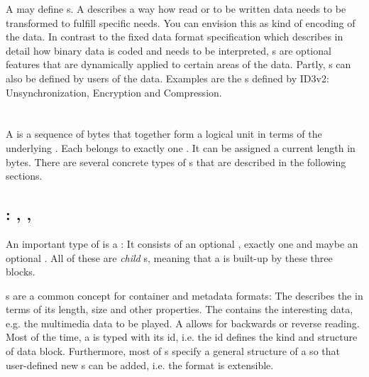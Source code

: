 A \TERMdataFormat{} may define \TERMtransformation{}s. A \TERMtransformation{} describes a way how read or to be written data needs to be transformed to fulfill specific needs. You can envision this as kind of encoding of the data. In contrast to the fixed data format specification which describes in detail how binary data is coded and needs to be interpreted, \TERMtransformation{}s are optional features that are dynamically applied to certain areas of the data. Partly, \TERMtransformation{}s can also be defined by users of the data. Examples are the \TERMtransformation{}s defined by ID3v2: Unsynchronization, Encryption and Compression.


\section{\TERMdataBlocks{}}
\label{sec:DataBlocks}

A \TERMdataBlock{} is a sequence of bytes that together form a logical unit in terms of the underlying \TERMdataFormat{}. Each \TERMdataBlock{} belongs to exactly one \TERMdataFormat{}. It can be assigned a current length in bytes. There are several concrete types of \TERMdataBlock{}s that are described in the following sections.


\subsection{\TERMcontainer{}: \TERMpayload{}, \TERMheader{}, \TERMfooter{}}
\label{sec:Containers}

An important type of \TERMdataBlock{} is a \TERMcontainer{}: It consists of an optional \TERMheader{}, exactly one \TERMpayload{} and maybe an optional \TERMfooter{}. All of these are \emph{child} \TERMdataBlock{}s, meaning that a \TERMcontainer{} is built-up by these three blocks.

\TERMcontainer{}s are a common concept for container and metadata formats: The \TERMheader{} describes the \TERMcontainer{} in terms of its length, size and other properties. The \TERMpayload{} contains the interesting data, e.g. the multimedia data to be played. A \TERMfooter{} allows for backwards or reverse reading. Most of the time, a \TERMcontainer{} is typed with its id, i.e. the id defines the kind and structure of data block. Furthermore, most of \TERMdataFormat{}s specify a general structure of a \TERMcontainer{} so that user-defined new \TERMcontainer{}s can be added, i.e. the format is extensible.

